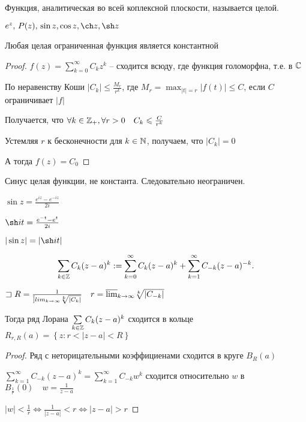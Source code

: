 \begin{definition}
    Функция, аналитическая во всей коплексной плоскости, называется целой.
\end{definition}

\begin{example}
    $e^z,\,P(z),\, \sin z, \cos z, \ch z, \sh z$
\end{example}

\begin{theorem}[Лиувили]
    Любая целая ограниченная функция является константной
\end{theorem}
\begin{proof}
    $f(z) = \sum_{k = 0}^{\infty }C_k z^k$ -- сходится всюду, где функция голоморфна, т.е. в $\mathbb{C}$

    По неравенству Коши $|C_k| \leqslant \frac{M_{r}}{r^k}$, где $M_r = \max_{|t| = r}|f(t)| \leqslant C$, если $C$ ограничивает $|f|$

    Получается, что $\forall k\in \mathbb{Z} _+, \forall r>0\quad C_k \leqslant \frac{C}{r^k}$

    Устемляя $r$ к бесконечности для $k\in \mathbb{N} $, получаем, что $|C_k| = 0$

    А тогда $f(z) = C_0$
\end{proof}

\begin{corollary}
    Синус целая функции, не константа. Следовательно неограничен.

    $\sin z = \frac{e^{iz} - e^{-iz}}{2i}$

    $\sh it = \frac{e^{-t} - e^t}{2i}$

    $|\sin z| = |\sh it|$
\end{corollary}

\begin{definition}

    \[
    \sum_{k\in \Z} C_k (z - a)^k := \sum_{k=0}^{\infty }C_k(z-a)^k + \sum_{k=1}^{\infty } C_{-k}(z-a)^{-k}
    .\]
\end{definition}

\begin{theorem}

    $\sqsupset R = \frac{1}{\ov ]lim_{k \to \infty }\sqrt[k]{|C_k|} }\quad r = \ov\lim_{k\to \infty}\sqrt[k]{|C_{-k}|} $

    Тогда ряд Лорана $\sum_{k\in \Z} C_k(z-a)^k$ сходится в кольце $R_{r,R}(a) = \left\{ z: r<|z-a|<R \right\}$
\end{theorem}
\begin{proof}
    Ряд с неторицательными коэффициенами сходится в круге $B_R(a)$

    $\sum_{k=1}^{\infty }C_{-k}(z-a)^k  = \sum_{k=1}^{\infty }C_{-k}w^k$ сходится относительно $w$ в $B_{\frac{1}{r}}(0)\quad w = \frac{1}{z-a}$

    $|w| < \frac{1}{r} \iff \frac{1}{|z-a|}< r \iff |z-a|  > r$
\end{proof}

